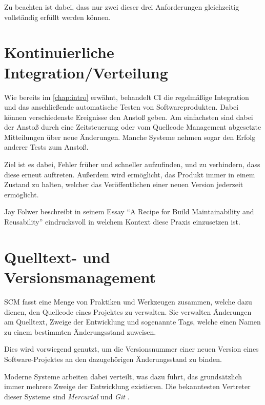 Zu beachten ist dabei, dass nur zwei dieser drei Anforderungen gleichzeitig
vollständig erfüllt werden können.

\section{Kontinuierliche Integration/Verteilung}
\label{sec:base:ci}

Wie bereits im \cref{chap:intro} erwähnt, behandelt \ac{CI} die regelmäßige Integration und das anschließende automatische Testen von Softwareprodukten.
Dabei können verschiedenste Ereignisse den Anstoß geben.
Am einfachsten sind dabei der Anstoß durch eine Zeitsteuerung
oder vom Quellcode Management abgesetzte Mitteilungen über neue Änderungen.
Manche Systeme nehmen sogar den Erfolg anderer Tests zum Anstoß.

Ziel ist es dabei, Fehler früher und schneller aufzufinden,
und zu verhindern, dass diese erneut auftreten.
Außerdem wird ermöglicht, das Produkt immer in einem Zustand zu halten,
welcher das Veröffentlichen einer neuen Version jederzeit ermöglicht.

Jay Folwer beschreibt in seinem Essay ``A Recipe for Build Maintainability and Reusability'' \cite{folwer:receipe} eindrucksvoll in welchem Kontext diese Praxis einzusetzen ist.


\section{Quelltext- und Versionsmanagement}
\label{sec:base:scm}


\ac{SCM} fasst eine Menge von Praktiken und Werkzeugen zusammen,
welche dazu dienen, den Quellcode eines Projektes zu verwalten.
Sie verwalten Änderungen am Quelltext, Zweige der Entwicklung und sogenannte Tags,
welche einen Namen zu einem bestimmten Änderungsstand zuweisen.

Dies wird vorwiegend genutzt, um die Versionsnummer einer neuen Version eines Software-Projektes an den dazugehörigen Änderungsstand zu binden.

Moderne Systeme arbeiten dabei verteilt,
was dazu führt, das grundsätzlich immer mehrere Zweige der Entwicklung existieren.
Die bekanntesten Vertreter dieser Systeme sind \emph{Mercurial} \cite{mercurial:website}
und \emph{Git} \cite{git:website}.


